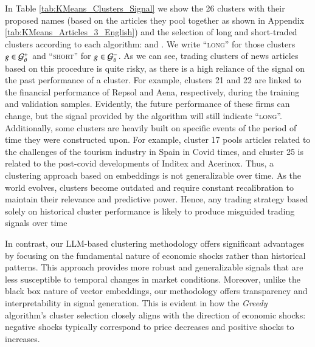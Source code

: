 
In Table \ref{tab:KMeans_Clusters_Signal} we show the 26 clusters with their proposed names (based on the articles they pool together as shown in Appendix \cref{tab:KMeans_Articles_3_English}) and the selection of long and short-traded clusters according to each algorithm:  and . We write ``\textsc{long}'' for those clusters $g\in\mathcal{G}_\theta^+$ and ``\textsc{short}'' for $g\in\mathcal{G}_\theta^-$. 
%
As we can see, trading clusters of news articles based on this procedure is quite risky, as there is a high reliance of the signal on the past performance of a cluster. For example, clusters 21 and 22 are linked to the financial performance of Repsol and Aena, respectively, during the training and validation samples. Evidently, the future performance of these firms can change, but the signal provided by the algorithm will still indicate ``\textsc{long}''. 
%
Additionally, some clusters are heavily built on specific events of the period of time they were constructed upon. For example, cluster 17 pools articles related to the challenges of the tourism industry in Spain in Covid times, and cluster 25 is related to the post-covid developments of Inditex and Acerinox. Thus, a clustering approach based on embeddings is not generalizable over time. As the world evolves, clusters become outdated and require constant recalibration to maintain their relevance and predictive power. Hence, any trading strategy based solely on historical cluster performance is likely to produce misguided trading signals over time 


In contrast, our LLM-based clustering methodology offers significant advantages by focusing on the fundamental nature of economic shocks rather than historical patterns. This approach provides more robust and generalizable signals that are less susceptible to temporal changes in market conditions. Moreover, unlike the black box nature of vector embeddings, our methodology offers transparency and interpretability in signal generation. This is evident in how the \textit{Greedy} algorithm's cluster selection closely aligns with the direction of economic shocks: negative shocks typically correspond to price decreases and positive shocks to increases. 

